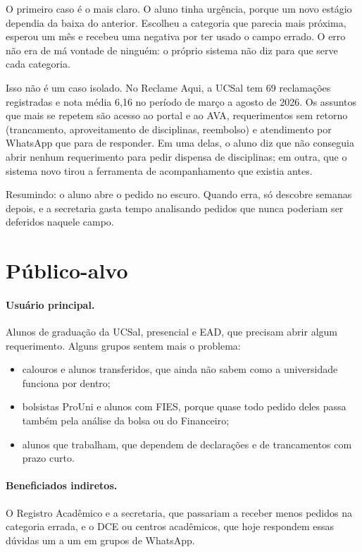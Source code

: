 \documentclass[12pt,a4paper]{article}
\begin{document}
O primeiro caso é o mais claro. O aluno tinha urgência, porque um novo estágio dependia da baixa do
anterior. Escolheu a categoria que parecia mais próxima, esperou um mês e recebeu uma negativa por ter
usado o campo errado. O erro não era de má vontade de ninguém: o próprio sistema não diz para que serve
cada categoria.

Isso não é um caso isolado. No Reclame Aqui, a UCSal tem 69 reclamações registradas e nota média 6,16
no período de março a agosto de 2026. Os assuntos que mais se repetem são acesso ao portal e ao AVA,
requerimentos sem retorno (trancamento, aproveitamento de disciplinas, reembolso) e atendimento por
WhatsApp que para de responder. Em uma delas, o aluno diz que não conseguia abrir nenhum requerimento
para pedir dispensa de disciplinas; em outra, que o sistema novo tirou a ferramenta de acompanhamento
que existia antes.

Resumindo: o aluno abre o pedido no escuro. Quando erra, só descobre semanas depois, e a secretaria
gasta tempo analisando pedidos que nunca poderiam ser deferidos naquele campo.

\section{Público-alvo}

\paragraph{Usuário principal.} Alunos de graduação da UCSal, presencial e EAD, que precisam abrir algum
requerimento. Alguns grupos sentem mais o problema:
\begin{itemize}
  \item calouros e alunos transferidos, que ainda não sabem como a universidade funciona por dentro;
  \item bolsistas ProUni e alunos com FIES, porque quase todo pedido deles passa também pela análise
        da bolsa ou do Financeiro;
  \item alunos que trabalham, que dependem de declarações e de trancamentos com prazo curto.
\end{itemize}

\paragraph{Beneficiados indiretos.} O Registro Acadêmico e a secretaria, que passariam a receber menos
pedidos na categoria errada, e o DCE ou centros acadêmicos, que hoje respondem essas dúvidas um a um em
grupos de WhatsApp.
\end{document}
